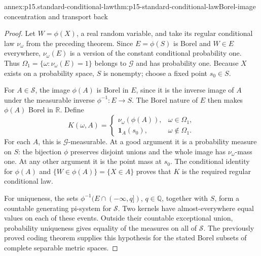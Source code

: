 \begin{annexitem}{annex:p15.standard-conditional-law}{thm:p15-standard-conditional-law}{Borel-image concentration and transport back}
\begin{proof}
Let \(W=\phi(X)\), a real random variable, and take its regular
conditional law \(\nu_\omega\) from the preceding theorem.
Since \(E=\phi(S)\) is Borel and \(W\in E\) everywhere,
\(\nu_\omega(E)\) is a version of the constant conditional
probability one. Thus
\(\Omega_1=\{\omega:\nu_\omega(E)=1\}\) belongs to \(\mathcal G\)
and has probability one.
Because \(X\) exists on a probability space, \(S\) is nonempty;
choose a fixed point \(s_0\in S\).

For \(A\in\mathcal S\), the image \(\phi(A)\) is Borel in \(E\),
since it is the inverse image of \(A\) under the measurable inverse
\(\phi^{-1}:E\to S\).
The Borel nature of \(E\) then makes \(\phi(A)\) Borel in \(\mathbb R\).
Define
\[
 K(\omega,A)=
 \begin{cases}
  \nu_\omega(\phi(A)),&\omega\in\Omega_1,\\
  \mathbf1_A(s_0),&\omega\notin\Omega_1.
 \end{cases}
\]
For each \(A\), this is \(\mathcal G\)-measurable.
At a good argument it is a probability measure on \(S\):
the bijection \(\phi\) preserves disjoint unions and the whole
image has \(\nu_\omega\)-mass one.
At any other argument it is the point mass at \(s_0\).
The conditional identity for \(\phi(A)\) and
\(\{W\in\phi(A)\}=\{X\in A\}\) proves that \(K\) is the
required regular conditional law.

For uniqueness, the sets
\(\phi^{-1}(E\cap(-\infty,q])\), \(q\in\mathbb Q\), together
with \(S\), form a countable generating pi-system for \(\mathcal S\).
Two kernels have almost-everywhere equal values on each of these
events. Outside their countable exceptional union, probability
uniqueness gives equality of the measures on all of \(\mathcal S\).
The previously proved coding theorem supplies this hypothesis for
the stated Borel subsets of complete separable metric spaces.
\end{proof}
\end{annexitem}

